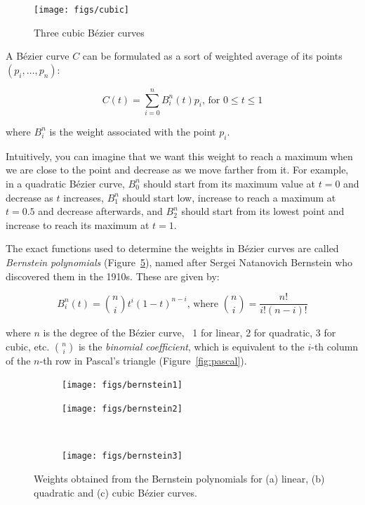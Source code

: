 \begin{figure}
\centering
\texttt{[image: figs/cubic]}
\caption{Three cubic B\'ezier curves}%
\label{fig:cubic}
\end{figure}

A B\'ezier curve \(C\) can be formulated as a sort of weighted average of its points \((p_i, \ldots, p_n)\):

\begin{equation}
\label{eq:beziercurve}
C(t) = \sum_{i=0}^n B^n_i(t) p_i\text{, for }0 \leq t \leq 1
\end{equation}

where \(B^n_i\) is the weight associated with the point \(p_i\).

Intuitively, you can imagine that we want this weight to reach a maximum when we are close to the point and decrease as we move farther from it.
For example, in a quadratic B\'ezier curve, \(B^n_0\) should start from its maximum value at \(t=0\) and decrease as \(t\) increases, \(B^n_1\) should start low, increase to reach a maximum at \(t=0.5\) and decrease afterwards, and \(B^n_2\) should start from its lowest point and increase to reach its maximum at \(t=1\).

The exact functions used to determine the weights in B\'ezier curves are called \emph{Bernstein polynomials} (Figure~\ref{fig:bernstein}), named after Sergei Natanovich Bernstein who discovered them in the 1910s.
These are given by:

\begin{equation}
\label{eq:bernstein}
B^n_i(t) = \binom{n}{i} t^i (1-t)^{n-i}\text{, where }\binom{n}{i} = \frac{n!}{i! (n-i)!}
\end{equation}

where \(n\) is the degree of the B\'ezier curve, \ie\ 1 for linear, 2 for quadratic, 3 for cubic, etc.
\(\binom{n}{i}\) is the \emph{binomial coefficient}, which is equivalent to the \(i\)-th column of the \(n\)-th row in Pascal's triangle (Figure~\ref{fig:pascal}).

\begin{figure}
\centering
\begin{subfigure}{0.5\linewidth}
\texttt{[image: figs/bernstein1]}
\caption{}%
\label{subfig:bernstein1}
\end{subfigure}%
\begin{subfigure}{0.5\linewidth}
\texttt{[image: figs/bernstein2]}
\caption{}%
\label{subfig:bernstein2}
\end{subfigure}\\
\begin{subfigure}{0.5\linewidth}
\texttt{[image: figs/bernstein3]}
\caption{}%
\label{subfig:bernstein3}
\end{subfigure}%
\caption{Weights obtained from the Bernstein polynomials for (a) linear, (b) quadratic and (c) cubic B\'ezier curves.}%
\label{fig:bernstein}
\end{figure}

